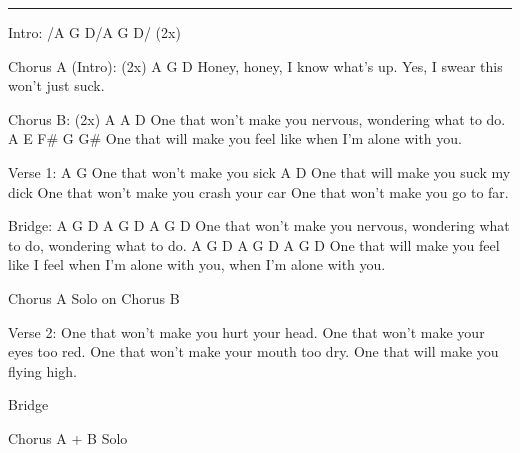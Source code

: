 \noindent\rule{\columnwidth}{1pt}

\begin{lstsong}
Intro: /A   G D/A  G D/ (2x)

Chorus A (Intro): (2x)
A              G            D 
Honey, honey, I know what's up.
Yes, I swear this won't just suck.

Chorus B: (2x)
A                                 A                     D
One that won't make you nervous, wondering what to do.
A                                E                   F# G G#
One that will make you feel like when I'm alone with you.

Verse 1:
A                            G
One that won't make you sick
A                              D
One that will make you suck my dick
One that won't make you crash your car
One that won't make you go to far.

Bridge:
A                    G   D       A          G      D    A          G       D
One that won't make you nervous, wondering what to do, wondering what to do.
A                  G      D             A        G         D     A        G         D 
One that will make you feel like I feel when I'm alone with you, when I'm alone with you.

Chorus A
Solo on Chorus B

Verse 2:
One that won't make you hurt your head.
One that won't make your eyes too red.
One that won't make your mouth too dry.
One that will make you flying high.

Bridge

Chorus A + B
Solo
\end{lstsong}
\newpage


